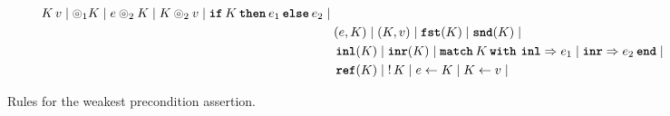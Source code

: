 \documentclass[thesis.tex]{subfiles}
\begin{document}
\begin{figure}[th!]
\begin{align*}
        \lctx\, \val \mid
        \HLOp_1 \lctx \mid
        \expr \HLOp_2 \lctx \mid
        \lctx \HLOp_2 \val \mid
        \If \lctx then \expr_1 \Else \expr_2 \mid
        {}                          \\ &
        (\expr, \lctx) \mid
        (\lctx, \val) \mid
        \Fst(\lctx) \mid
        \Snd(\lctx) \mid
        {}                          \\ &
        \Inl(\lctx) \mid
        \Inr(\lctx) \mid
        \Match \lctx with \Inl => \expr_1 | \Inr => \expr_2 end \mid
        {}                          \\ &
        \Alloc(\lctx) \mid
        \deref \lctx \mid
        \expr \gets \lctx \mid
        \lctx \gets \val \mid
    \end{align*}
    \caption{Rules for the weakest precondition assertion.}
    \label{fig:wp-rules}
\end{figure}
\end{document}
